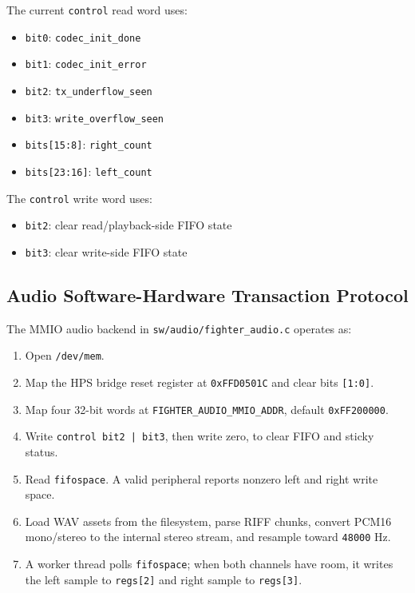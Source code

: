 \documentclass[12pt,a4paper]{article}
\begin{document}
\noindent The current \texttt{control} read word uses:

\begin{itemize}
  \item \texttt{bit0}: \texttt{codec\_init\_done}
  \item \texttt{bit1}: \texttt{codec\_init\_error}
  \item \texttt{bit2}: \texttt{tx\_underflow\_seen}
  \item \texttt{bit3}: \texttt{write\_overflow\_seen}
  \item \texttt{bits[15:8]}: \texttt{right\_count}
  \item \texttt{bits[23:16]}: \texttt{left\_count}
\end{itemize}

\noindent The \texttt{control} write word uses:

\begin{itemize}
  \item \texttt{bit2}: clear read/playback-side FIFO state
  \item \texttt{bit3}: clear write-side FIFO state
\end{itemize}

\subsection{Audio Software-Hardware Transaction Protocol}

The MMIO audio backend in \texttt{sw/audio/fighter\_audio.c} operates as:

\begin{enumerate}
  \item Open \texttt{/dev/mem}.
  \item Map the HPS bridge reset register at \texttt{0xFFD0501C} and clear
  bits \texttt{[1:0]}.
  \item Map four 32-bit words at \texttt{FIGHTER\_AUDIO\_MMIO\_ADDR}, default
  \texttt{0xFF200000}.
  \item Write \texttt{control bit2 | bit3}, then write zero, to clear FIFO and
  sticky status.
  \item Read \texttt{fifospace}. A valid peripheral reports nonzero left and
  right write space.
  \item Load WAV assets from the filesystem, parse RIFF chunks, convert PCM16
  mono/stereo to the internal stereo stream, and resample toward
  \texttt{48000} Hz.
  \item A worker thread polls \texttt{fifospace}; when both channels have room,
  it writes the left sample to \texttt{regs[2]} and right sample to
  \texttt{regs[3]}.
\end{enumerate}
\end{document}
